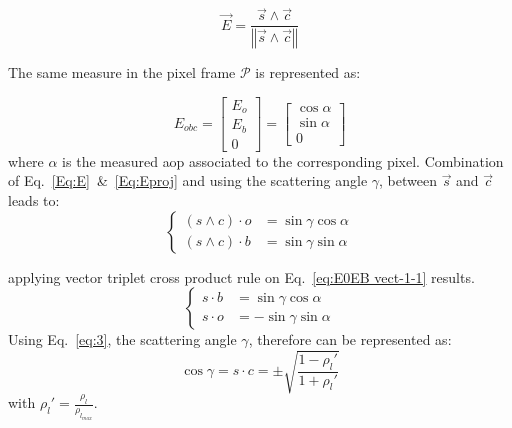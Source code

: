 \begin{equation}
\vec{E}=\frac{\vec{s}\wedge \vec{c}}{\left\Vert \vec{s}\wedge
    \vec{c}\right\Vert }
\label{Eq:E}
\end{equation}

The same measure in the pixel frame $\mathcal{P}$  is represented as:

\begin{equation}
E_{obc}=\left[\begin{array}{l}
E_{o}\\
E_{b}\\
0
\end{array}\right]=\left[\begin{array}{l}
\cos\alpha\\
\sin\alpha\\
0
\end{array}\right]
\label{Eq:Eproj}
\end{equation}
\noindent where $\alpha$ is the measured \gls{aop} associated to the corresponding pixel.
Combination of Eq.~\ref{Eq:E}~\&~\ref{Eq:Eproj} and using the
scattering angle $\gamma$, between $\vec{s}$ and $\vec{c}$ leads to:
\begin{equation}
  \begin{cases}
(s\wedge c)\cdot o & =\sin\gamma\cos\alpha\\
(s\wedge c)\cdot b & =\sin\gamma\sin\alpha
\end{cases}
\label{eq:E0EB vect-1-1}
\end{equation}

\noindent applying vector triplet cross product rule on Eq.~\ref{eq:E0EB
  vect-1-1} results.
\begin{equation}
\begin{cases}
s\cdot b & =\sin\gamma\cos\alpha\\
s\cdot o & =-\sin\gamma\sin\alpha
\end{cases}
\label{eq:scal-b-o}
\end{equation}
Using Eq.~\ref{eq:3}, the scattering angle $\gamma$, therefore can be
represented as:
\begin{equation}
\cos\gamma=s\cdot c=\pm\sqrt{\frac{1-\rho_{l}'}{1+\rho_{l}'}}
\label{Eq:cosg}
\end{equation}
\noindent with $\rho_{l}'=\frac{\rho_{l}}{\rho_{l_{max}}}.$ \\
\vspace{0.4mm}

